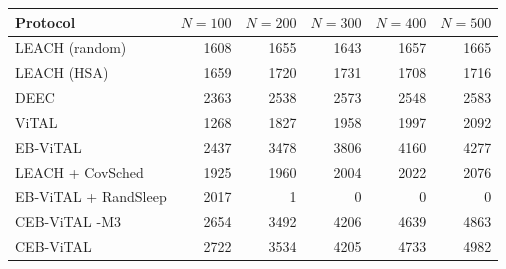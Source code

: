 \begin{tabular}{lrrrrr}
\hline
Protocol & $N=100$ & $N=200$ & $N=300$ & $N=400$ & $N=500$ \\
\hline
LEACH (random) & 1608 & 1655 & 1643 & 1657 & 1665 \\
LEACH (HSA) & 1659 & 1720 & 1731 & 1708 & 1716 \\
DEEC & 2363 & 2538 & 2573 & 2548 & 2583 \\
ViTAL & 1268 & 1827 & 1958 & 1997 & 2092 \\
EB-ViTAL & 2437 & 3478 & 3806 & 4160 & 4277 \\
LEACH + CovSched & 1925 & 1960 & 2004 & 2022 & 2076 \\
EB-ViTAL + RandSleep & 2017 & 1 & 0 & 0 & 0 \\
CEB-ViTAL -M3 & 2654 & 3492 & 4206 & 4639 & 4863 \\
CEB-ViTAL & 2722 & 3534 & 4205 & 4733 & 4982 \\
\hline
\end{tabular}
